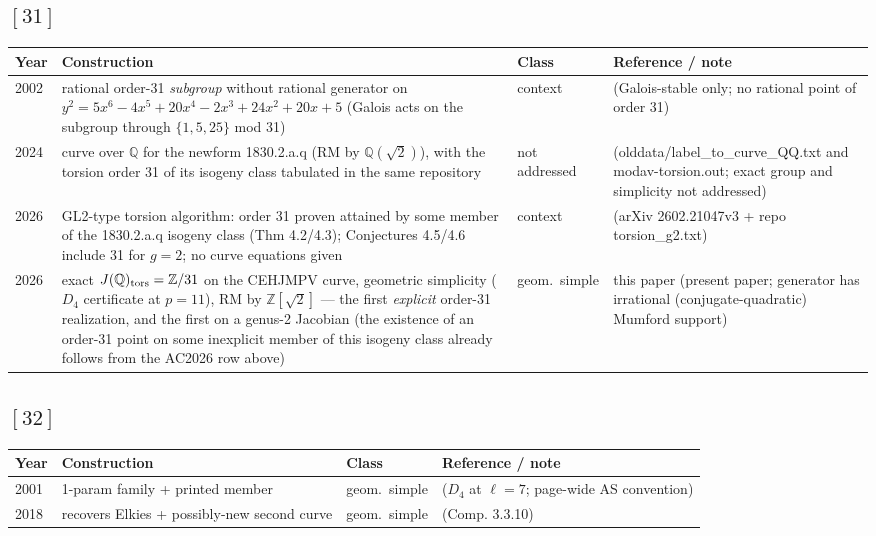 \documentclass[10pt]{amsart}
\begin{document}
\subsection*{$[31]$}
\begin{longtable}{p{0.9cm} p{7.6cm} p{2.3cm} p{4.2cm}}
\hline Year & Construction & Class & Reference / note \\ \hline
2002 & rational order-31 \emph{subgroup} without rational generator on $y^2 = 5x^6-4x^5+20x^4-2x^3+24x^2+20x+5$ (Galois acts on the subgroup through $\{1,5,25\}$ mod 31) & context & \cite{Elkies2002} (Galois-stable only; no rational point of order 31)\\
2024 & curve over $\mathbb{Q}$ for the newform 1830.2.a.q (RM by $\mathbb{Q}(\sqrt2)$), with the torsion order 31 of its isogeny class tabulated in the same repository & not addressed & \cite{CEHJMPV} (olddata/label\_to\_curve\_QQ.txt and modav-torsion.out; exact group and simplicity not addressed)\\
2026 & GL2-type torsion algorithm: order 31 proven attained by some member of the 1830.2.a.q isogeny class (Thm 4.2/4.3); Conjectures 4.5/4.6 include 31 for $g=2$; no curve equations given & context & \cite{AC2026} (arXiv 2602.21047v3 + repo torsion\_g2.txt)\\
2026 & exact $J(\mathbb{Q})_{\rm tors} = \mathbb{Z}/31$ on the CEHJMPV curve, geometric simplicity ($D_4$ certificate at $p=11$), RM by $\mathbb{Z}[\sqrt2]$ --- the first \emph{explicit} order-31 realization, and the first on a genus-2 Jacobian (the existence of an order-31 point on some inexplicit member of this isogeny class already follows from the AC2026 row above) & geom.\ simple & this paper (present paper; generator has irrational (conjugate-quadratic) Mumford support)\\
\hline\end{longtable}
\subsection*{$[32]$}
\begin{longtable}{p{0.9cm} p{7.6cm} p{2.3cm} p{4.2cm}}
\hline Year & Construction & Class & Reference / note \\ \hline
2001 & 1-param family + printed member & geom.\ simple & \cite{Elkies2002} ($D_4$ at $\ell{=}7$; page-wide AS convention)\\
2018 & recovers Elkies + possibly-new second curve & geom.\ simple & \cite{Nicholls2018} (Comp. 3.3.10)\\
\hline\end{longtable}
\end{document}
